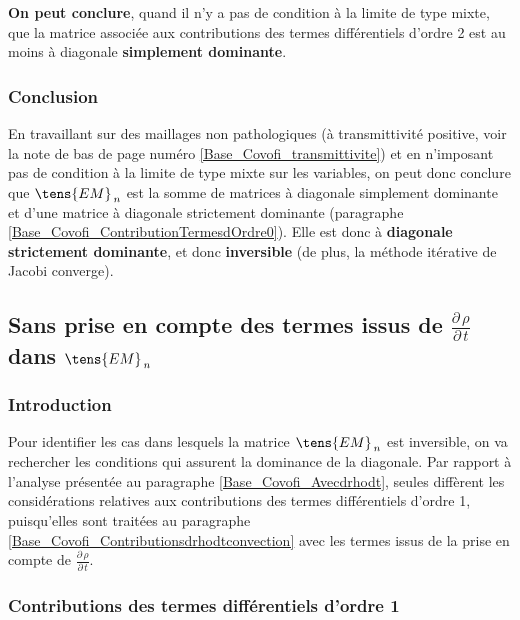 {\bf On peut conclure}, quand il n'y a pas de condition \`a la limite de type mixte,
que la matrice associ\'ee aux contributions des termes diff\'erentiels d'ordre 2
 est au moins \`a diagonale {\bf simplement dominante}.



\subsubsection*{Conclusion}
En travaillant sur
des maillages non pathologiques (\`a transmittivit\'e positive, voir la note de
bas de page num\'ero \ref{Base_Covofi_transmittivite}) et en n'imposant pas de condition \`a la limite
de type mixte sur les variables, on peut donc conclure que
$\tens{EM}_{\,n}$ est la somme de matrices \`a diagonale simplement
dominante et d'une matrice \`a diagonale strictement dominante (paragraphe
\ref{Base_Covofi_ContributionTermesdOrdre0}). Elle est donc  \`a {\bf diagonale strictement
dominante}, et donc {\bf inversible} (de plus, la
m\'ethode it\'erative de Jacobi converge).


\subsection*{Sans prise en compte des termes issus de
$\displaystyle \frac {{\partial}\,\rho}{{\partial}\,t}$ dans
$\tens{EM}_{\,n}$}


\subsubsection*{Introduction}

Pour identifier les cas dans lesquels la matrice $\tens{EM}_{\,n}$ est
inversible,  on va rechercher les
conditions qui assurent la dominance de la diagonale. Par rapport \`a l'analyse
pr\'esent\'ee au paragraphe \ref{Base_Covofi_Avecdrhodt}, seules diff\`erent les
consid\'erations relatives aux contributions des termes diff\'erentiels d'ordre
1, puisqu'elles sont trait\'ees au paragraphe
\ref{Base_Covofi_Contributionsdrhodtconvection} avec les termes issus de la prise en compte
de $\displaystyle\frac {{\partial}\,\rho}{{\partial}\,t}$.

\subsubsection*{Contributions des termes diff\'erentiels d'ordre 1}


